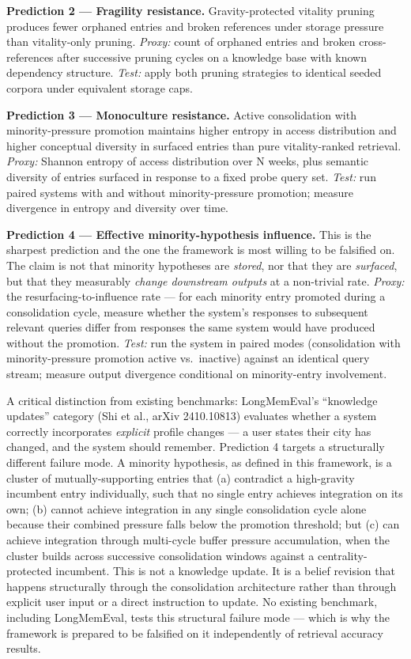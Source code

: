 \documentclass[
  11pt,
]{article}
\begin{document}
\textbf{Prediction 2 --- Fragility resistance.} Gravity-protected
vitality pruning produces fewer orphaned entries and broken references
under storage pressure than vitality-only pruning. \emph{Proxy:} count
of orphaned entries and broken cross-references after successive pruning
cycles on a knowledge base with known dependency structure. \emph{Test:}
apply both pruning strategies to identical seeded corpora under
equivalent storage caps.

\textbf{Prediction 3 --- Monoculture resistance.} Active consolidation
with minority-pressure promotion maintains higher entropy in access
distribution and higher conceptual diversity in surfaced entries than
pure vitality-ranked retrieval. \emph{Proxy:} Shannon entropy of access
distribution over N weeks, plus semantic diversity of entries surfaced
in response to a fixed probe query set. \emph{Test:} run paired systems
with and without minority-pressure promotion; measure divergence in
entropy and diversity over time.

\textbf{Prediction 4 --- Effective minority-hypothesis influence.} This
is the sharpest prediction and the one the framework is most willing to
be falsified on. The claim is not that minority hypotheses are
\emph{stored}, nor that they are \emph{surfaced}, but that they
measurably \emph{change downstream outputs} at a non-trivial rate.
\emph{Proxy:} the resurfacing-to-influence rate --- for each minority
entry promoted during a consolidation cycle, measure whether the
system's responses to subsequent relevant queries differ from responses
the same system would have produced without the promotion. \emph{Test:}
run the system in paired modes (consolidation with minority-pressure
promotion active vs.~inactive) against an identical query stream;
measure output divergence conditional on minority-entry involvement.

A critical distinction from existing benchmarks: LongMemEval's
``knowledge updates'' category (Shi et al., arXiv 2410.10813) evaluates
whether a system correctly incorporates \emph{explicit} profile changes
--- a user states their city has changed, and the system should
remember. Prediction 4 targets a structurally different failure mode. A
minority hypothesis, as defined in this framework, is a cluster of
mutually-supporting entries that (a) contradict a high-gravity incumbent
entry individually, such that no single entry achieves integration on
its own; (b) cannot achieve integration in any single consolidation
cycle alone because their combined pressure falls below the promotion
threshold; but (c) can achieve integration through multi-cycle buffer
pressure accumulation, when the cluster builds across successive
consolidation windows against a centrality-protected incumbent. This is
not a knowledge update. It is a belief revision that happens
structurally through the consolidation architecture rather than through
explicit user input or a direct instruction to update. No existing
benchmark, including LongMemEval, tests this structural failure mode ---
which is why the framework is prepared to be falsified on it
independently of retrieval accuracy results.
\end{document}
